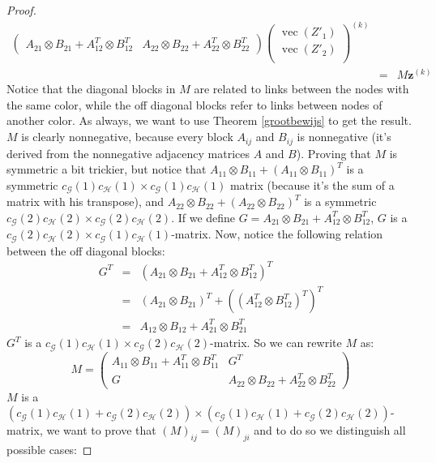 \documentclass[a4paper,11pt]{report}
\newcommand{\graf}{\mathscr{G}}
\newcommand{\grafeen}{\mathscr{H}}
\newcommand{\vect}{\operatorname{vec}}
\begin{document}
\begin{proof}
\begin{eqnarray*}
\begin{pmatrix}
A_{21}\otimes B_{21} + A^T_{12}\otimes B^T_{12} & A_{22}\otimes B_{22} + A^T_{22}\otimes B^T_{22}
\end{pmatrix}
\begin{pmatrix}
\vect(Z'_1)\\
\vect(Z'_2)\\
\end{pmatrix}^{(k)}\\
&=& M\mathbf{z}^{(k)}
\end{eqnarray*}
Notice that the diagonal blocks in $M$ are related to links between the nodes with the same color, 
while the off diagonal blocks refer to links between nodes of another color. As 
always, we want to use Theorem \ref{grootbewijs} to get the result. $M$ is 
clearly nonnegative, because every block $A_{ij}$ and $B_{ij}$ is nonnegative (it's derived from the nonnegative adjacency matrices $A$ and 
$B$). Proving that $M$ is symmetric a bit trickier, but notice that $A_{11}\otimes B_{11} + (A_{11}\otimes B_{11})^T$
is a symmetric $c_\graf(1)c_\grafeen(1)\times c_\graf(1)c_\grafeen(1)$ matrix (because it's the sum of a matrix with his transpose), and $A_{22}\otimes B_{22} + (A_{22}\otimes B_{22})^T$ is a symmetric 
$c_\graf(2)c_\grafeen(2)\times c_\graf(2)c_\grafeen(2)$. If we define $G = A_{21} \otimes B_{21} + A^T_{12}\otimes B^T_{12}$, $G$ is a $c_\graf(2)c_\grafeen(2) \times c_\graf(1)c_\grafeen(1)$-matrix. Now, notice the following relation between the off diagonal blocks:
\begin{eqnarray*}
  G^T &=& (A_{21} \otimes B_{21} + A^T_{12}\otimes B^T_{12})^T \\
  &=& (A_{21} \otimes B_{21})^T + ((A^T_{12}\otimes B^T_{12})^T)^T\\
  &=& A_{12}\otimes B_{12}+A^T_{21}\otimes B^T_{21}
  \end{eqnarray*}
$G^T$ is a $c_\graf(1)c_\grafeen(1) \times c_\graf(2)c_\grafeen(2)$-matrix.
So we can rewrite $M$ as:
$$M = \begin{pmatrix}
A_{11}\otimes B_{11} + A^T_{11}\otimes B^T_{11}& G^T\\
G & A_{22}\otimes B_{22} + A^T_{22}\otimes B^T_{22}
\end{pmatrix}$$
 $M$ is a $(c_\graf(1)c_\grafeen(1)+c_\graf(2)c_\grafeen(2))\times(c_\graf(1)c_\grafeen(1)+c_\graf(2)c_\grafeen(2))$-matrix, we want to prove that $(M)_{ij}  = (M)_{ji}$ and to do so we distinguish all possible cases: 
 

\end{proof}
\end{document}
